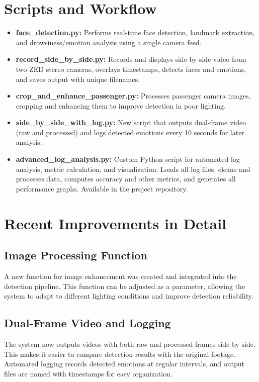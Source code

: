 \documentclass[12pt]{article}
\begin{document}
\section{Scripts and Workflow}
\begin{itemize}
    \item \textbf{face\_detection.py:} Performs real-time face detection, landmark extraction, and drowsiness/emotion analysis using a single camera feed.
    \item \textbf{record\_side\_by\_side.py:} Records and displays side-by-side video from two ZED stereo cameras, overlays timestamps, detects faces and emotions, and saves output with unique filenames.
    \item \textbf{crop\_and\_enhance\_passenger.py:} Processes passenger camera images, cropping and enhancing them to improve detection in poor lighting.
    \item \textbf{side\_by\_side\_with\_log.py:} New script that outputs dual-frame video (raw and processed) and logs detected emotions every 10 seconds for later analysis.
    \item \textbf{advanced\_log\_analysis.py:} Custom Python script for automated log analysis, metric calculation, and visualization. Loads all log files, cleans and processes data, computes accuracy and other metrics, and generates all performance graphs. Available in the project repository.
\end{itemize}

\section{Recent Improvements in Detail}
\subsection{Image Processing Function}
A new function for image enhancement was created and integrated into the detection pipeline. This function can be adjusted as a parameter, allowing the system to adapt to different lighting conditions and improve detection reliability.

\subsection{Dual-Frame Video and Logging}
The system now outputs videos with both raw and processed frames side by side. This makes it easier to compare detection results with the original footage. Automated logging records detected emotions at regular intervals, and output files are named with timestamps for easy organization.
\end{document}
